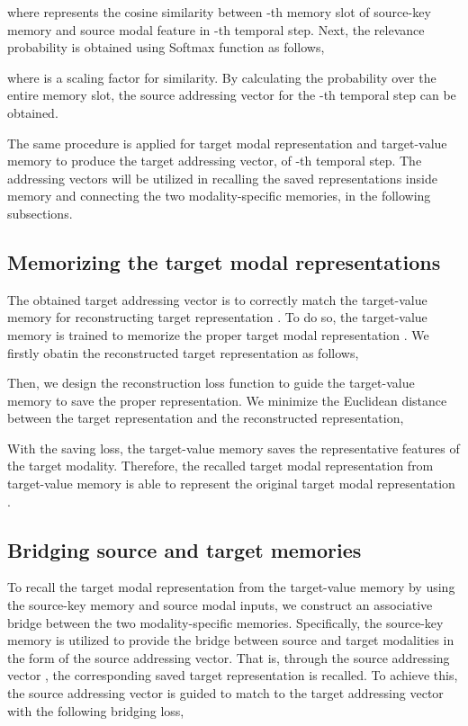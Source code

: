 \documentclass[10pt,twocolumn,letterpaper]{article}
\begin{document}
where  represents the cosine similarity between -th memory slot of source-key memory and source modal feature in -th temporal step.
Next, the relevance probability is obtained using Softmax function as follows,

where  is a scaling factor for similarity. By calculating the probability over the entire memory slot, the source addressing vector for the -th temporal step  can be obtained.

The same procedure is applied for target modal representation  and target-value memory  to produce the target addressing vector,  of -th temporal step. The addressing vectors will be utilized in recalling the saved representations inside memory and connecting the two modality-specific memories, in the following subsections.

\subsection{Memorizing the target modal representations}
The obtained target addressing vector  is to correctly match the target-value memory  for reconstructing target representation . To do so, the target-value memory  is trained to memorize the proper target modal representation . We firstly obatin the reconstructed target representation  as follows,

Then, we design the reconstruction loss function to guide the target-value memory  to save the proper representation. We minimize the Euclidean distance between the target representation and the reconstructed representation,

With the saving loss, the target-value memory  saves the representative features of the target modality. Therefore, the recalled target modal representation  from target-value memory  is able to represent the original target modal representation .

\subsection{Bridging source and target memories}
\vspace{-0.11cm}
To recall the target modal representation from the target-value memory by using the source-key memory and source modal inputs, we construct an associative bridge between the two modality-specific memories. Specifically, the source-key memory is utilized to provide the bridge between source and target modalities in the form of the source addressing vector. That is, through the source addressing vector , the corresponding saved target representation is recalled.
To achieve this, the source addressing vector  is guided to match to the target addressing vector  with the following bridging loss,
\end{document}
